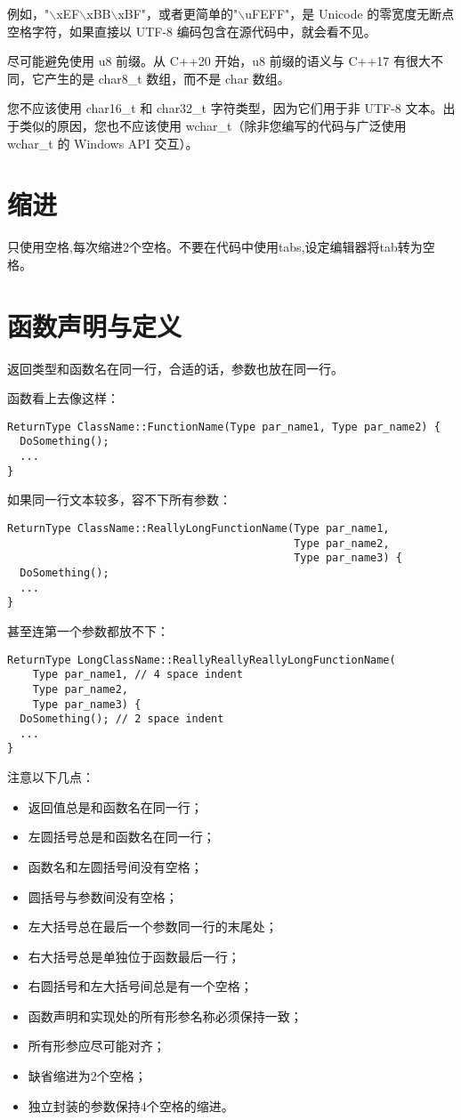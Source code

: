 例如，"$\backslash$xEF$\backslash$xBB$\backslash$xBF"，或者更简单的"$\backslash$uFEFF"，是 Unicode 的零宽度无断点空格字符，如果直接以 UTF-8 编码包含在源代码中，就会看不见。

尽可能避免使用 u8 前缀。从 C++20 开始，u8 前缀的语义与 C++17 有很大不同，它产生的是 char8\_t 数组，而不是 char 数组。

您不应该使用 char16\_t 和 char32\_t 字符类型，因为它们用于非 UTF-8 文本。出于类似的原因，您也不应该使用 wchar\_t（除非您编写的代码与广泛使用 wchar\_t 的 Windows API 交互）。


\section{缩进}
只使用空格,每次缩进2个空格。不要在代码中使用tabs,设定编辑器将tab转为空格。


\section{函数声明与定义}
返回类型和函数名在同一行，合适的话，参数也放在同一行。

函数看上去像这样：
\begin{verbatim}
ReturnType ClassName::FunctionName(Type par_name1, Type par_name2) {
  DoSomething();
  ...
}
\end{verbatim}

如果同一行文本较多，容不下所有参数：
\begin{verbatim}
ReturnType ClassName::ReallyLongFunctionName(Type par_name1,
                                             Type par_name2,
                                             Type par_name3) {
  DoSomething();
  ...
}
\end{verbatim}
甚至连第一个参数都放不下：
\begin{verbatim}
ReturnType LongClassName::ReallyReallyReallyLongFunctionName(
    Type par_name1, // 4 space indent
    Type par_name2,
    Type par_name3) {
  DoSomething(); // 2 space indent
  ...
}
\end{verbatim}

注意以下几点：
\begin{itemize}
  \item 返回值总是和函数名在同一行；
  \item 左圆括号总是和函数名在同一行；
  \item 函数名和左圆括号间没有空格；
  \item 圆括号与参数间没有空格；
  \item 左大括号总在最后一个参数同一行的末尾处；
  \item 右大括号总是单独位于函数最后一行；
  \item 右圆括号和左大括号间总是有一个空格；
  \item 函数声明和实现处的所有形参名称必须保持一致；
  \item 所有形参应尽可能对齐；
  \item 缺省缩进为2个空格；
  \item 独立封装的参数保持4个空格的缩进。
\end{itemize}

